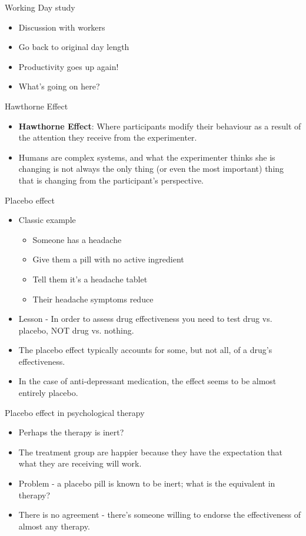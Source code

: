 \documentclass{beamer}
\begin{document}
\begin{frame}{Working Day study}
\begin{itemize}
\item Discussion with workers
\item Go back to original day length
\item Productivity goes up again!
\item What's going on here?
\end{itemize}
\end{frame}

\begin{frame}{Hawthorne Effect}
\begin{itemize}

\item \textbf{Hawthorne Effect}: Where participants modify their behaviour as a result of the attention they receive from the experimenter.

\item Humans are complex systems, and what the experimenter thinks she is changing is not always the only thing (or even the most important) thing that is changing from the participant's perspective.

\end{itemize}
\end{frame}

\begin{frame}{Placebo effect}
\begin{itemize}
\item Classic example
\begin{itemize}
\item Someone  has a headache
\item Give them a pill with no active ingredient
\item Tell them it's a headache tablet
\item Their headache symptoms reduce
\end{itemize}
\item Lesson - In order to assess drug effectiveness you need to test drug vs. placebo, NOT drug vs. nothing.
\item The placebo effect typically accounts for some, but not all, of a drug's effectiveness.
\item In the case of anti-depressant medication, the effect seems to be almost entirely placebo.
\end{itemize}
\end{frame}

\begin{frame}{Placebo effect in psychological therapy}
\begin{itemize}
\item Perhaps the therapy is inert?
\item The treatment group are happier because they have the expectation that what they are receiving will work.
\item Problem - a placebo pill is known to be inert; what is the equivalent in therapy?
\item There is no agreement - there's someone willing to endorse the effectiveness of almost any therapy.
\end{itemize}
\end{frame}
\end{document}

